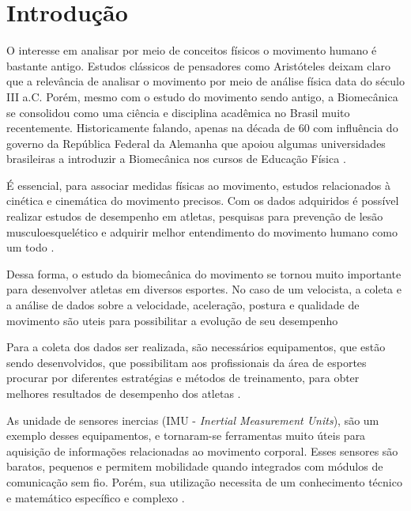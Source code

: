 
\chapter[Introdução]{Introdução}

O interesse em analisar por meio de conceitos físicos o movimento humano é bastante antigo. Estudos clássicos de pensadores como Aristóteles deixam claro que a relevância de analisar o movimento por meio de análise física data do século III a.C. Porém, mesmo com o estudo do movimento sendo antigo, a Biomecânica se consolidou como uma ciência e disciplina acadêmica no Brasil muito recentemente. Historicamente falando, apenas na década de 60 com influência do governo da República Federal da Alemanha que apoiou algumas universidades brasileiras a introduzir a Biomecânica nos cursos de Educação Física \cite{Acquesta2008}.

É essencial, para associar medidas físicas ao movimento,  estudos relacionados à cinética e cinemática do movimento precisos. Com os dados adquiridos é possível realizar estudos de desempenho em atletas, pesquisas para prevenção de lesão musculoesquelético e adquirir melhor entendimento do movimento humano como um todo \cite{mcginnis2013}.

Dessa forma, o estudo da biomecânica do movimento se tornou muito importante para desenvolver atletas em diversos esportes. No caso de um velocista, a coleta e a análise de dados sobre a velocidade, aceleração, postura e qualidade de movimento são uteis para possibilitar a evolução de seu desempenho \cite{okazaki2012}

Para a coleta dos dados ser realizada, são necessários equipamentos, que estão sendo desenvolvidos, que possibilitam aos profissionais da área de esportes procurar por diferentes estratégias e métodos de treinamento, para obter melhores resultados de desempenho dos atletas \cite{okazaki2012}.

As unidade de sensores inercias (IMU - \textit{Inertial Measurement Units}), são um exemplo desses equipamentos, e tornaram-se ferramentas muito úteis para aquisição de informações relacionadas ao movimento corporal. Esses sensores são baratos, pequenos e permitem mobilidade quando integrados com módulos de comunicação sem fio. Porém, sua utilização necessita de um conhecimento técnico e matemático específico e complexo \cite{ober2015}.

